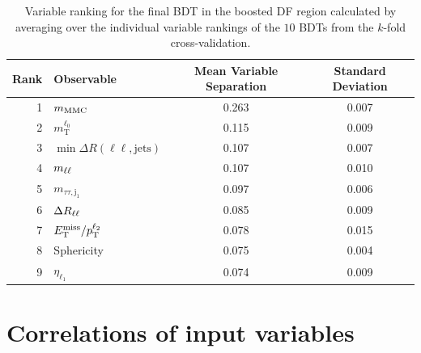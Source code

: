\begin{table}[htpb]
    \centering
    \caption{Variable ranking for the final BDT in the boosted DF region calculated by averaging over the individual
             variable rankings of the $10$ BDTs from the $k$-fold cross-validation.}\label{tab:mva:variables:ranking:BOOSTDF}
    \begin{tabular}{rlcc}
        \toprule
        Rank & Observable & Mean Variable Separation & Standard Deviation \\ \midrule
        1 & $m_\text{MMC}$ & 0.263 & 0.007 \\
        2 & $m_\text{T}^{\ell_0}$ & 0.115 & 0.009 \\
        3 & $\min \Delta R (\ell\ell, \text{jets})$ & 0.107 & 0.007 \\
        4 & $m_{\ell\ell}$ & 0.107 & 0.010 \\
        5 & $m_{\tau\tau,\text{j}_1}$ & 0.097 & 0.006 \\
        6 & $\Delta R_{\ell\ell}$ & 0.085 & 0.009 \\
        7 & $E_\text{T}^\text{miss} / p_\text{T}^{\ell_2}$ & 0.078 & 0.015 \\
        8 & Sphericity & 0.075 & 0.004 \\
        9 & $\eta_{\ell_1}$ & 0.074 & 0.009 \\
        \bottomrule
    \end{tabular}
\end{table}

\section{Correlations of input variables}\label{app:mva:correlation_inputvars}

